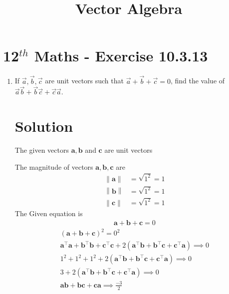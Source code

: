 \documentclass[12pt]{article}
\let\vec\mathbf
\providecommand{\norm}[1]{\left\lVert#1\right\rVert}
\let\vec\mathbf
\begin{document}
\begin{center}
\title{\textbf{Vector Algebra}}
\date{\vspace{-5ex}} %
\maketitle
\end{center}
\setcounter{page}{1}
\section{12$^{th}$ Maths - Exercise 10.3.13}
\begin{enumerate}
\item If $\overrightarrow{a},\overrightarrow{b},\overrightarrow{c}$ are unit vectors such that $\overrightarrow{a}+\overrightarrow{b}+\overrightarrow{c}=0$, find the value of $\overrightarrow{a}\overrightarrow{b}+\overrightarrow{b}\overrightarrow{c}+\overrightarrow{c}\overrightarrow{a}$.  
\section{Solution}
The given vectors $\vec{a},\vec{b}$ and $\vec{c}$ are unit vectors
                
        The magnitude of vectors $\vec{a},\vec{b},\vec{c}$ are
        \begin{align}
\norm{\vec{a}} &=\sqrt{1^2}=1\\ \norm{\vec{b}}&=\sqrt{1^2}=1\\ \norm{\vec{c}}&=\sqrt{1^2}=1
        \end{align}
The Given equation is 
        \begin{align}
\vec{a}+\vec{b}+\vec{c}=0
\end{align}      
\begin{align}
({\vec{a}+{\vec{b}}+{\vec{c}}})^2=0^2\\
{\vec{a}^\top\vec{a}}+{\vec{b}^\top\vec{b}}+{\vec{c}^\top\vec{c}}+2({{\vec{a}^\top}{\vec{b}}+{\vec{b}^\top}{\vec{c}}+{\vec{c}^\top}{\vec{a}}})\implies0\\
{1}^2+{1}^2+{1}^2+2({{\vec{a}^\top}{\vec{b}}+{\vec{b}^\top}{\vec{c}}+{\vec{c}^\top}{\vec{a}}})\implies0\\
3+2({{\vec{a}^\top}{\vec{b}}+{\vec{b}^\top}{\vec{c}}+{\vec{c}^\top}{\vec{a}}})\implies0\\
{\vec{a}}{\vec{b}}+{\vec{b}}{\vec{c}}+{\vec{c}}{\vec{a}}\implies\frac{-3}{2}
\end{align}
\end{enumerate}
\end{document}
